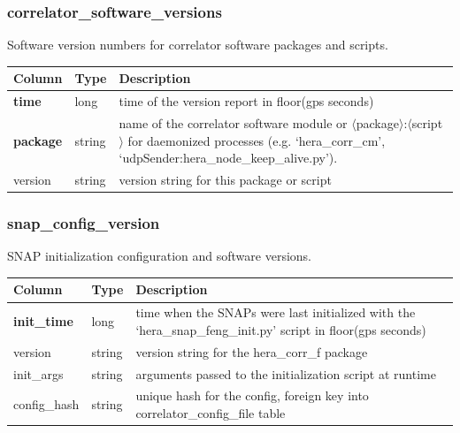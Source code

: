 \documentclass{article}
\begin{document}
{\subsubsection{correlator\_software\_versions}
Software version numbers for correlator software packages and scripts.
\begin{center}
 \begin{tabular}{| p{4cm} | p{2cm} | p{10cm} |}
\hline
 {\bf Column} & {\bf Type}  & {\bf Description} \\ [0.5ex]  \hline\hline
\textbf{time} & long & time of the version report in floor(gps seconds)\\ \hline
\textbf{package} & string & name of the correlator software module or $\langle$package$\rangle$:$\langle$script$\rangle$ for daemonized processes (e.g. `hera\_corr\_cm', `udpSender:hera\_node\_keep\_alive.py').  \\ \hline
version & string & version string for this package or script \\\hline
\end{tabular}
\end{center}

\subsubsection{snap\_config\_version}
SNAP initialization configuration and software versions.
\begin{center}
 \begin{tabular}{| p{4cm} | p{2cm} | p{10cm} |}
\hline
 {\bf Column} & {\bf Type}  & {\bf Description} \\ [0.5ex]  \hline\hline
\textbf{init\_time} & long & time when the SNAPs were last initialized with the `hera\_snap\_feng\_init.py' script in floor(gps seconds)\\ \hline
version & string & version string for the hera\_corr\_f package \\\hline
init\_args & string & arguments passed to the initialization script at runtime \\\hline
config\_hash & string & unique hash for the config, foreign key into correlator\_config\_file table \\\hline
\end{tabular}
\end{center}

}
\end{document}
